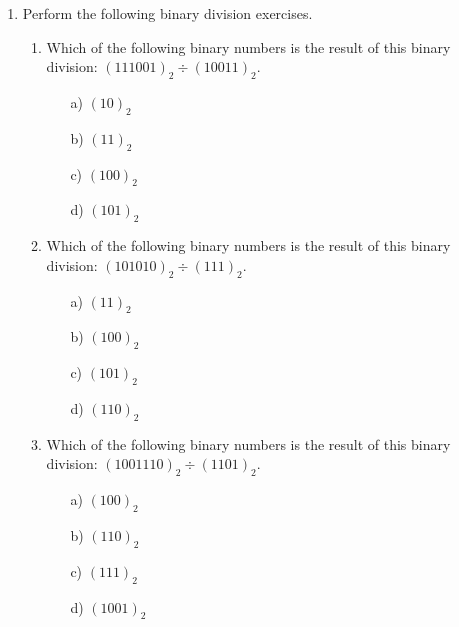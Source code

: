 \documentclass[]{article}
\begin{document}
\begin{enumerate}
	\newpage
	
	\item Perform the following binary division exercises.
	
	\begin{enumerate}
		\item Which of the following binary numbers is the result of this binary division: $(111001)_{2} \div ( 10011)_{2}$. %
		\begin{multicols}{2}
			\begin{itemize}
				\item[a)] $(10)_2$ %
				\item[b)] $(11)_{2}$ %
				\item[c)] $(100)_{2}$ %
				\item[d)] $(101)_{2}$ %
			\end{itemize}
		\end{multicols}
		\item Which of the following binary numbers is the result of this binary division: $(101010)_{2} \div ( 111 )_{2}$. %
		\begin{multicols}{2}
			\begin{itemize}
				\item[a)] $(11)_2$ %
				\item[b)] $(100)_{2}$ %
				\item[c)] $(101)_{2}$ %
				\item[d)] $(110)_{2}$ %
			\end{itemize}
		\end{multicols}
		\item Which of the following binary numbers is the result of this binary division: $(1001110)_{2} \div ( 1101 )_{2}$. %
		\begin{multicols}{2}
			\begin{itemize}
				
				\item[a)] $(100)_{2}$ %
				\item[b)] $(110)_{2}$ %
				\item[c)] $(111)_{2}$ %
				\item[d)] $(1001)_2$ %
			\end{itemize}
		\end{multicols}
	\end{enumerate}
	
	
\end{enumerate}
\newpage
\end{document}
